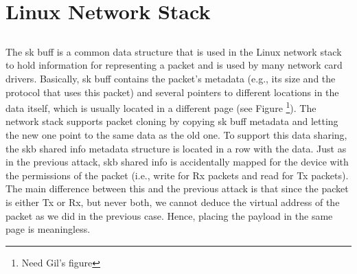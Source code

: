 \section{Linux Network Stack}

\subsection{\shinfo}
The sk buff is a common data structure that is used in the Linux network stack to
hold information for representing a packet and is used by many network card drivers.
Basically, sk buff contains the packet’s metadata (e.g., its size and the protocol that
uses this packet) and several pointers to different locations in the data itself, which is
usually located in a different page (see Figure \footnote{Need Gil's figure}). The network stack supports packet
cloning by copying sk buff metadata and letting the new one point to the same data
as the old one. To support this data sharing, the skb shared info metadata structure
is located in a row with the data. Just as in the previous attack, skb shared info is
accidentally mapped for the device with the permissions of the packet (i.e., write for Rx
packets and read for Tx packets).
The main difference between this and the previous attack is that since the packet is
either Tx or Rx, but never both, we cannot deduce the virtual address of the packet as we did in the previous case. Hence, placing the payload in the same page is meaningless.

